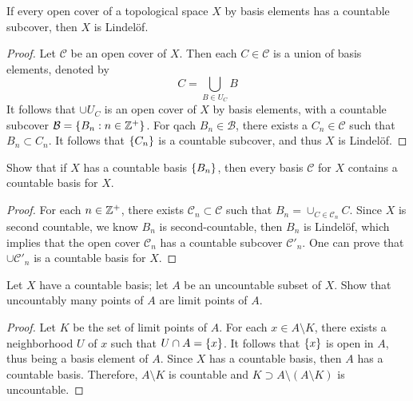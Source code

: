 \documentclass[12pt,a4paper]{article}
\begin{document}
    \begin{ex}
        If every open cover of a topological space $X$ by basis elements has a countable subcover, then $X$ is Lindel\"of.
    \end{ex}
    \begin{proof}
        Let $\mathcal{C}$ be an open cover of $X$. Then each $C\in\mathcal{C}$ is a union of basis elements, denoted by
        $$
        C=\bigcup_{B\in U_C}B
        $$
        It follows that $\cup U_C$ is an open cover of $X$ by basis elements, with a countable subcover $\mathcal{B}=\left\{B_n:n\in\mathbb{Z}^+\right\}$. For qach $B_n\in\mathcal{B}$, there exists a $C_n\in\mathcal{C}$ such that $B_n\subset C_n$. It follows that $\left\{C_n\right\}$ is a countable subcover, and thus $X$ is Lindel\"of.
    \end{proof}
    \hfill

    \begin{ex}
        Show that if $X$ has a countable basis $\left\{B_n\right\}$, then every basis $\mathcal{C}$ for $X$ contains a countable basis for $X$.
    \end{ex}
    \begin{proof}
        For each $n\in\mathbb{Z}^+$, there exists $\mathcal{C}_n\subset\mathcal{C}$ such that $B_n=\cup_{C\in\mathcal{C}_n} C$. Since $X$ is second countable, we know $B_n$ is second-countable, then $B_n$ is Lindel\"of, which implies that the open cover $\mathcal{C}_n$ has a countable subcover $\mathcal{C'}_n$. One can prove that $\cup\mathcal{C'}_n$ is a countable basis for $X$.
    \end{proof}
    \hfill

    \begin{ex}
        Let $X$ have a countable basis; let $A$ be an uncountable subset of $X$. Show that uncountably many points of $A$ are limit points of $A$.
    \end{ex}
    \begin{proof}
        Let $K$ be the set of limit points of $A$. For each $x\in A\setminus K$, there exists a neighborhood $U$ of $x$ such that $U\cap A=\left\{x\right\}$. It follows that $\left\{x\right\}$ is open in $A$, thus being a basis element of $A$. Since $X$ has a countable basis, then $A$ has a countable basis. Therefore, $A\setminus K$ is countable and $K\supset A\setminus(A\setminus K)$ is uncountable.   
    \end{proof}
    \hfill
\end{document}

